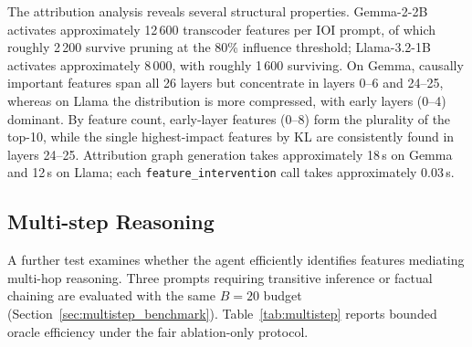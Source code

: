 The attribution analysis reveals several structural properties.
Gemma-2-2B activates approximately 12\,600 transcoder features per
IOI prompt, of which roughly 2\,200 survive pruning at the 80\%
influence threshold; Llama-3.2-1B activates approximately 8\,000,
with roughly 1\,600 surviving.  On Gemma, causally important features
span all 26 layers but concentrate in layers 0--6 and 24--25, whereas
on Llama the distribution is more compressed, with early layers
(0--4) dominant.  By feature count, early-layer features (0--8)
form the plurality of the top-10, while the single highest-impact
features by KL are consistently found in layers 24--25.
Attribution graph generation takes approximately
18\,s on Gemma and 12\,s on Llama; each
\texttt{feature\_intervention} call takes approximately 0.03\,s.


\subsection{Multi-step Reasoning}
\label{sec:multistep}

A further test examines whether the agent efficiently identifies features
mediating multi-hop reasoning.  Three prompts requiring transitive
inference or factual chaining are evaluated with the same $B=20$
budget (Section~\ref{sec:multistep_benchmark}).  Table~\ref{tab:multistep}
reports bounded oracle efficiency under the fair ablation-only protocol.


